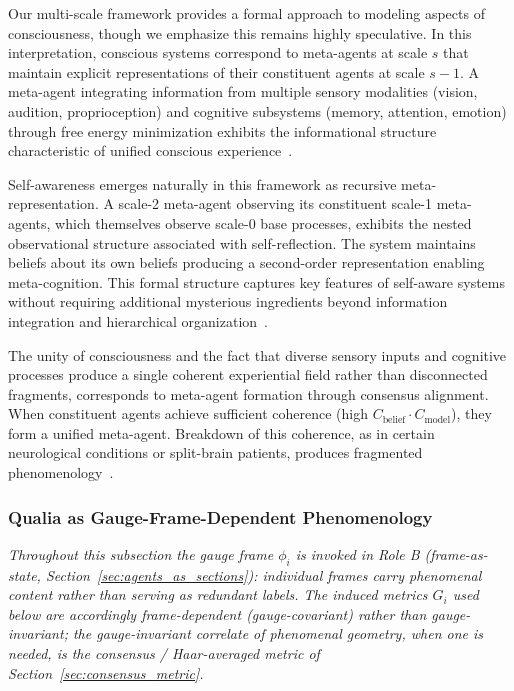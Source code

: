 \documentclass[11pt]{article}
\begin{document}
Our multi-scale framework provides a formal approach to modeling aspects of consciousness, though we emphasize this remains highly speculative. In this interpretation, conscious systems correspond to meta-agents at scale $s$ that maintain explicit representations of their constituent agents at scale $s-1$. A meta-agent integrating information from multiple sensory modalities (vision, audition, proprioception) and cognitive subsystems (memory, attention, emotion) through free energy minimization exhibits the informational structure characteristic of unified conscious experience~\cite{Tononi2004, Dehaene2014}.

Self-awareness emerges naturally in this framework as recursive meta-representation. A scale-2 meta-agent observing its constituent scale-1 meta-agents, which themselves observe scale-0 base processes, exhibits the nested observational structure associated with self-reflection. The system maintains beliefs about its own beliefs producing a second-order representation enabling meta-cognition. This formal structure captures key features of self-aware systems without requiring additional mysterious ingredients beyond information integration and hierarchical organization~\cite{Cleeremans2007}.

The unity of consciousness and the fact that diverse sensory inputs and cognitive processes produce a single coherent experiential field rather than disconnected fragments, corresponds to meta-agent formation through consensus alignment. When constituent agents achieve sufficient coherence (high $C_{\text{belief}} \cdot C_{\text{model}}$), they form a unified meta-agent. Breakdown of this coherence, as in certain neurological conditions or split-brain patients, produces fragmented phenomenology~\cite{Bayne2010}.

\subsubsection{Qualia as Gauge-Frame-Dependent Phenomenology}
\label{sec:qualia}

\emph{Throughout this subsection the gauge frame $\phi_i$ is invoked in Role B (frame-as-state, Section~\ref{sec:agents_as_sections}): individual frames carry phenomenal content rather than serving as redundant labels. The induced metrics $G_i$ used below are accordingly frame-dependent (gauge-covariant) rather than gauge-invariant; the gauge-invariant correlate of phenomenal geometry, when one is needed, is the consensus / Haar-averaged metric of Section~\ref{sec:consensus_metric}.}
\end{document}
